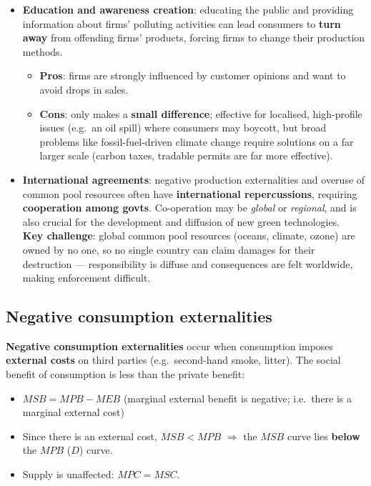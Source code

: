 \begin{itemize}
\begin{itemize}
\begin{itemize}
      \item Requires a supporting \textbf{legal system of land/resource rights} to function effectively.
    \end{itemize}
  \end{itemize}
  \item \textbf{Education and awareness creation}: educating the public and providing information about firms' polluting activities can lead consumers to \textbf{turn away} from offending firms' products, forcing firms to change their production methods.
  \begin{itemize}
    \item \textbf{Pros}: firms are strongly influenced by customer opinions and want to avoid drops in sales.
    \item \textbf{Cons}: only makes a \textbf{small difference}; effective for localised, high-profile issues (e.g.\ an oil spill) where consumers may boycott, but broad problems like fossil-fuel-driven climate change require solutions on a far larger scale (carbon taxes, tradable permits are far more effective).
  \end{itemize}
  \item \textbf{International agreements}: negative production externalities and overuse of common pool resources often have \textbf{international repercussions}, requiring \textbf{cooperation among govts}. Co-operation may be \textit{global} or \textit{regional}, and is also crucial for the development and diffusion of new green technologies.\\
  \textbf{Key challenge}: global common pool resources (oceans, climate, ozone) are owned by no one, so no single country can claim damages for their destruction --- responsibility is diffuse and consequences are felt worldwide, making enforcement difficult.
\end{itemize}
\subsection{Negative consumption externalities}
\textbf{Negative consumption externalities} occur when consumption imposes \textbf{external costs} on third parties (e.g.\ second-hand smoke, litter). The social benefit of consumption is less than the private benefit:
\begin{itemize}
  \item $MSB = MPB - MEB$ (marginal external benefit is negative; i.e.\ there is a marginal external cost)
  \item Since there is an external cost, $MSB < MPB$ $\Rightarrow$ the $MSB$ curve lies \textbf{below} the $MPB$ ($D$) curve.
  \item Supply is unaffected: $MPC = MSC$.
\end{itemize}

